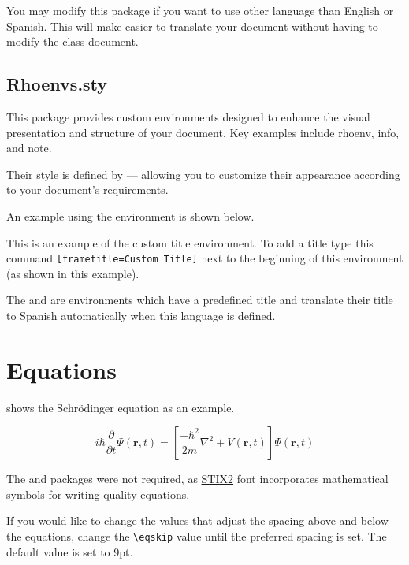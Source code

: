 \documentclass[9pt,a4paper,twocolumn,twoside]{rho-class/rho}
\begin{document}
		You may modify this package if you want to use other language than English or Spanish. This will make easier to translate your document without having to modify the class document.

    \subsection{Rhoenvs.sty}

        This package provides custom environments designed to enhance the visual presentation and structure of your document. Key examples include rhoenv, info, and note.
        
		Their style is defined by  — allowing you to customize their appearance according to your document’s requirements.

		An example using the  environment is shown below.
		
		\begin{rhoenv}[frametitle=Custom Title]
			This is an example of the custom title environment. To add a title type this command \verb|[frametitle=Custom Title]| next to the beginning of this environment (as shown in this example).
		\end{rhoenv}

        The  and  are environments which have a predefined title and translate their title to Spanish automatically when this language is defined.

\section{Equations}

	 shows the Schrödinger equation as an example. 

    \begin{equation}\label{eq:equation}
        i\hbar \frac{\partial }{\partial t}\Psi(\mathbf{r},t) = \left[\frac{-\hbar^2}{2m}\nabla^2 + V(\mathbf{r},t) \right]\Psi(\mathbf{r},t)
    \end{equation}
	
	The  and  packages were not required, as \href{https://ctan.org/pkg/stix2-otf/}{STIX2} font incorporates mathematical symbols for writing quality equations.
	
	\begin{note}
		If you would like to change the values that adjust the spacing above and below the equations, change the \verb|\eqskip| value until the preferred spacing is set. The default value is set to 9pt.
	\end{note}
\end{document}

